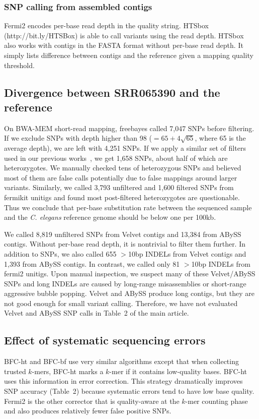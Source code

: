 \documentclass{bioinfo2}
\begin{document}
\subsubsection{SNP calling from assembled contigs}
Fermi2 encodes per-base read depth in the quality string. HTSbox
(http://bit.ly/HTSBox) is able to call variants using the read depth.
HTSbox also works with contigs in the FASTA format without per-base read depth.
It simply lists difference between contigs and the reference given a
mapping quality threshold.

\subsection{Divergence between SRR065390 and the reference}
On BWA-MEM short-read mapping, freebayes called 7,047 SNPs before filtering. If
we exclude SNPs with depth higher than 98 ($=65+4\sqrt{65}$, where 65 is the
average depth), we are left with 4,251 SNPs. If we apply a similar set of
filters used in our previous works~\citep{Li:2014aa}, we get 1,658 SNPs, about
half of which are heterozygotes. We manually checked tens of heterozygous SNPs
and believed most of them are false calls potentially due to false mappings
around larger variants. Similarly, we called 3,793 unfiltered and 1,600 filtered
SNPs from fermikit unitigs and found most post-filtered heterozygotes are
questionable. Thus we conclude that per-base substitution rate between the
sequenced sample and the {\it C. elegans} reference genome should be below one
per 100kb.

We called 8,819 unfiltered SNPs from Velvet contigs and 13,384 from ABySS contigs.
Without per-base read depth, it is nontrivial to filter them further. In addition
to SNPs, we also called 655 $>$10bp INDELs from Velvet contigs and 1,393 from
ABySS contigs. In contrast, we called only 81 $>$10bp INDELs from fermi2 unitigs.
Upon manual inspection, we suspect many of these Velvet/ABySS SNPs and long
INDELs are caused by long-range misassemblies or short-range aggressive bubble
popping.  Velvet and ABySS produce long contigs, but they are not good enough
for small variant calling. Therefore, we have not evaluated Velvet and ABySS
SNP calls in Table~2 of the main article.

\subsection{Effect of systematic sequencing errors}
BFC-ht and BFC-bf use very similar algorithms except that when collecting
trusted $k$-mers, BFC-ht marks a $k$-mer if it contains low-quality bases. BFC-ht
uses this information in error correction. This strategy dramatically improves
SNP accuracy (Table~2) because systematic errors tend to have low base quality.
Fermi2 is the other corrector that is quality-aware at the $k$-mer counting
phase and also produces relatively fewer false positive SNPs.
\end{document}
